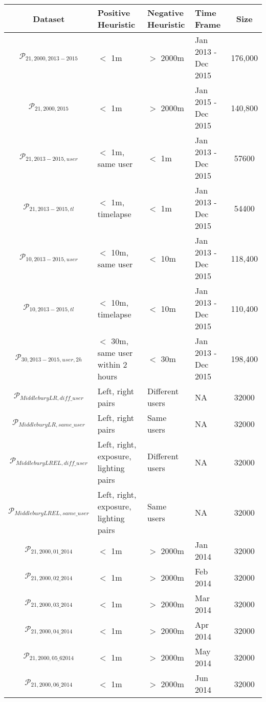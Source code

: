 \begin{table}
	\centering
	\begin{tabular}{c >{\centering\arraybackslash}m{3.2cm} >{\centering\arraybackslash}m{3cm} >{\centering\arraybackslash}m{2cm} c}
		\toprule
		\bfseries{Dataset} &  \bfseries Positive Heuristic & \bfseries Negative Heuristic & \bfseries Time Frame & \bfseries{Size}\\
		\midrule
		$\mathcal{P}_{21,2000,2013-2015}$ & $<$ 1m & $>$ 2000m & Jan 2013 - Dec 2015  & 176,000\\
		$\mathcal{P}_{21,2000,2015}$ & $<$ 1m & $>$ 2000m & Jan 2015 - Dec 2015  & 140,800\\
		$\mathcal{P}_{21,2013-2015,user}$ & $<$ 1m, same user & $<$ 1m & Jan 2013 - Dec 2015  & 57600\\
		$\mathcal{P}_{21,2013-2015,tl}$ & $<$ 1m, timelapse & $<$ 1m & Jan 2013 - Dec 2015  & 54400\\
		$\mathcal{P}_{10,2013-2015,user}$ & $<$ 10m, same user & $<$ 10m & Jan 2013 - Dec 2015  & 118,400\\
		$\mathcal{P}_{10,2013-2015,tl}$ & $<$ 10m, timelapse & $<$ 10m & Jan 2013 - Dec 2015  & 110,400\\
		$\mathcal{P}_{30,2013-2015,user,2h}$ & $<$ 30m, same user within 2 hours & $<$ 30m & Jan 2013 - Dec 2015  & 198,400\\
		$\mathcal{P}_{MiddleburyLR,diff\_user}$ & Left, right pairs & Different users & NA & 32000\\
		$\mathcal{P}_{MiddleburyLR,same\_user}$ & Left, right pairs& Same users  & NA& 32000\\
		$\mathcal{P}_{MiddleburyLREL,diff\_user}$ & Left, right, exposure, lighting pairs  & Different users  & NA & 32000\\
		$\mathcal{P}_{MiddleburyLREL,same\_user}$ & Left, right, exposure, lighting pairs  & Same users  & NA &32000\\
		$\mathcal{P}_{21,2000,01\_2014}$ & $<$ 1m & $>$ 2000m & Jan 2014  & 32000\\
		$\mathcal{P}_{21,2000,02\_2014}$ & $<$ 1m & $>$ 2000m & Feb 2014  & 32000\\
		$\mathcal{P}_{21,2000,03\_2014}$ & $<$ 1m & $>$ 2000m & Mar 2014 & 32000\\
		$\mathcal{P}_{21,2000,04\_2014}$ & $<$ 1m & $>$ 2000m & Apr 2014  & 32000\\
		$\mathcal{P}_{21,2000,05\_62014}$ & $<$ 1m & $>$ 2000m & May 2014  & 32000\\
		$\mathcal{P}_{21,2000,06\_2014}$ & $<$ 1m & $>$ 2000m & Jun 2014  & 32000\\

\end{tabular}
\end{table}
